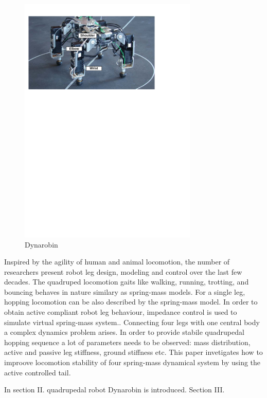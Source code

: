 \begin{figure}
	\centering
	\includegraphics[width=85mm]{./pictures/Dynarobin_introduction_image.pdf}
	\caption{Dynarobin}
	\label{fig:Dynarobin}
\end{figure}

Inspired by the agility of human and animal locomotion, the number of researchers present robot leg design, modeling and control over the last few decades\cite{CambridgeJournals:1345088}. The quadruped locomotion gaits like walking, running, trotting, and bouncing behaves in nature similary as spring-mass models\cite{Blickhan01}. For a single leg, hopping locomotion can be also described by the spring-mass model. In order to obtain active compliant robot leg behaviour, impedance control is used to simulate virtual spring-mass system.\cite{Havoutis01}. Connecting four legs with one central body a complex dynamics problem arises. In order to provide stabile quadrupedal hopping sequence a lot of parameters needs to be observed: mass distribution, active and passive leg stiffness, ground stiffness etc. This paper invetigates how to improove locomotion stability of four spring-mass dynamical system by using the active controlled tail.

In section II. quadrupedal robot Dynarobin is introduced. Section III.







